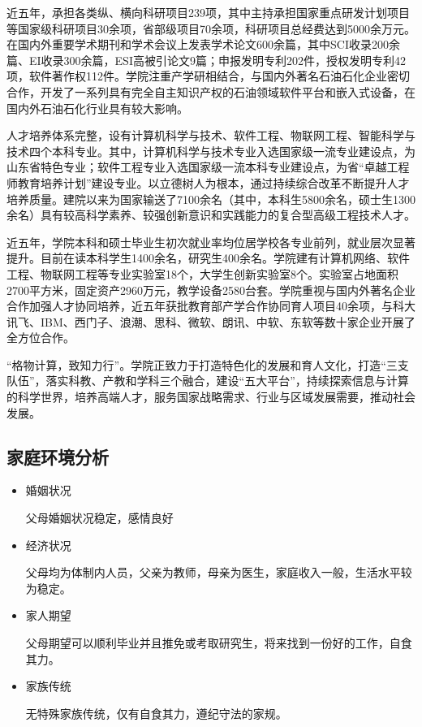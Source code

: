 \documentclass{article}
\begin{document}
\begin{itemize}
近五年，承担各类纵、横向科研项目239项，其中主持承担国家重点研发计划项目等国家级科研项目30余项，省部级项目70余项，科研项目总经费达到5000余万元。在国内外重要学术期刊和学术会议上发表学术论文600余篇，其中SCI收录200余篇、EI收录300余篇，ESI高被引论文9篇；申报发明专利202件，授权发明专利42项，软件著作权112件。学院注重产学研相结合，与国内外著名石油石化企业密切合作，开发了一系列具有完全自主知识产权的石油领域软件平台和嵌入式设备，在国内外石油石化行业具有较大影响。

人才培养体系完整，设有计算机科学与技术、软件工程、物联网工程、智能科学与技术四个本科专业。其中，计算机科学与技术专业入选国家级一流专业建设点，为山东省特色专业；软件工程专业入选国家级一流本科专业建设点，为省“卓越工程师教育培养计划”建设专业。以立德树人为根本，通过持续综合改革不断提升人才培养质量。建院以来为国家输送了7100余名（其中，本科生5800余名，硕士生1300余名）具有较高科学素养、较强创新意识和实践能力的复合型高级工程技术人才。

近五年，学院本科和硕士毕业生初次就业率均位居学校各专业前列，就业层次显著提升。目前在读本科学生1400余名，研究生400余名。学院建有计算机网络、软件工程、物联网工程等专业实验室18个，大学生创新实验室8个。实验室占地面积2700平方米，固定资产2960万元，教学设备2580台套。学院重视与国内外著名企业合作加强人才协同培养，近五年获批教育部产学合作协同育人项目40余项，与科大讯飞、IBM、西门子、浪潮、思科、微软、朗讯、中软、东软等数十家企业开展了全方位合作。

 “格物计算，致知力行”。学院正致力于打造特色化的发展和育人文化，打造“三支队伍”，落实科教、产教和学科三个融合，建设“五大平台”，持续探索信息与计算的科学世界，培养高端人才，服务国家战略需求、行业与区域发展需要，推动社会发展。

\end{itemize}
\subsection{家庭环境分析}
\begin{itemize}
\item 婚姻状况\par
父母婚姻状况稳定，感情良好
\item 经济状况\par
父母均为体制内人员，父亲为教师，母亲为医生，家庭收入一般，生活水平较为稳定。
\item 家人期望\par
父母期望可以顺利毕业并且推免或考取研究生，将来找到一份好的工作，自食其力。
\item 家族传统\par
无特殊家族传统，仅有自食其力，遵纪守法的家规。
\end{itemize}
\end{document}
